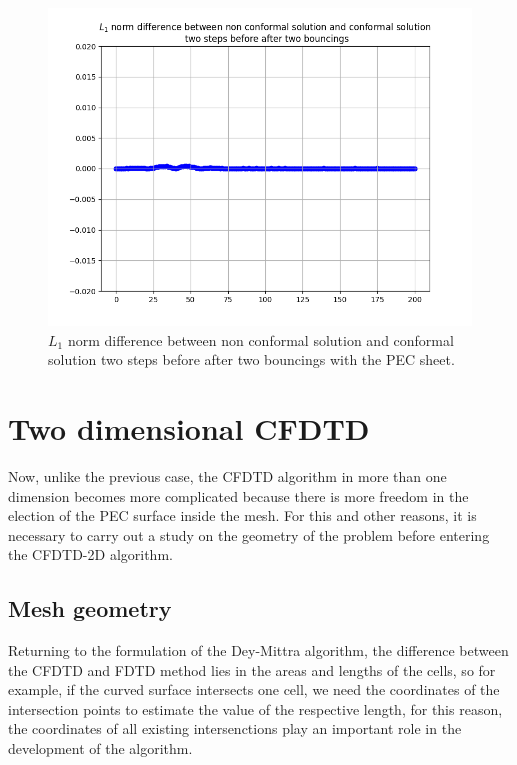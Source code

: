 \documentclass[12pt, oneside]{book}
\begin{document}
\begin{figure}[h!]
    \centering
    \includegraphics[scale=0.6]{Imagenes/CFDTD1D_DelayNorm.png}
    \caption{$L_1$ norm difference between non conformal solution and conformal solution two steps before after two bouncings with the PEC sheet.}
    \label{fig:CFDTD1D_DelayNorm}
\end{figure}
\newpage
\section{Two dimensional CFDTD}

Now, unlike the previous case, the CFDTD algorithm in more than one dimension becomes more complicated because there is more freedom in the election of the PEC surface inside the mesh. For this and other reasons, it is necessary to carry out a study on the geometry of the problem before entering the CFDTD-2D algorithm.

\subsection{Mesh geometry}

Returning to the formulation of the Dey-Mittra algorithm, the difference between the CFDTD and FDTD method lies in the areas and lengths of the cells, so for example, if the curved surface intersects one cell, we need the coordinates of the intersection points to estimate the value of the respective length, for this reason, the coordinates of all existing intersenctions play an important role in the development of the algorithm.
\end{document}
